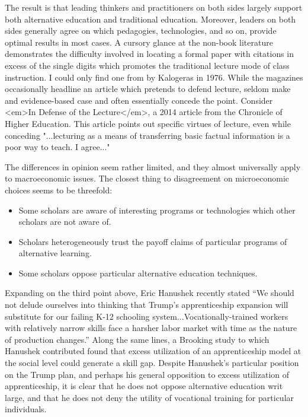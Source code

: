 \documentclass[AER]{/Users/zyl357/Documents/GitHub/research-dissertation-case-for-alt-ed/papers/alt-ed-survey/aea-latex-templates/AEA}
\begin{document}
The result is that leading thinkers and practitioners on both sides
largely support both alternative education and traditional education.
Moreover, leaders on both sides generally agree on which pedagogies,
technologies, and so on, provide optimal results in most cases. A cursory
glance at the non-book literature demonstrates the difficulty involved in
locating a formal paper with citations in excess of the single digits
which promotes the traditional lecture mode of class instruction. I could
only find one from by Kalogeras in 1976. While the magazines occasionally
headline an article which pretends to defend lecture, seldom make and
evidence-based case and often essentially concede the point. Consider
<em>In Defense of the Lecture</em>, a 2014 article from the Chronicle of
Higher Education. This article points out specific virtues of lecture,
even while conceding "...lecturing as a means of transferring basic
factual information is a poor way to teach. I agree..."

The differences in opinion seem rather limited, and they almost
universally apply to macroeconomic issues. The closest thing to
disagreement on microeconomic choices seems to be threefold:

\begin{itemize}
    \item Some scholars are aware of interesting programs or technologies which
    other scholars are not aware of.
    \item Scholars heterogeneously trust the payoff claims of particular programs of
    alternative learning.
    \item Some scholars oppose particular alternative education techniques.
\end{itemize}

Expanding on the third point above, Eric Hanushek recently stated “We
should not delude ourselves into thinking that Trump’s apprenticeship
expansion will substitute for our failing K-12 schooling
system...Vocationally-trained workers with relatively narrow skills face a
harsher labor market with time as the nature of production changes.” Along
the same lines, a Brooking study to which Hanushek contributed found that
excess utilization of an apprenticeship model at the social level could
generate a skill gap. Despite Hanushek's particular position on the
Trump plan, and perhaps his general opposition to excess utilization of
apprenticeship, it is clear that he does not oppose alternative education
writ large, and that he does not deny the utility of vocational training
for particular individuals.
\end{document}
